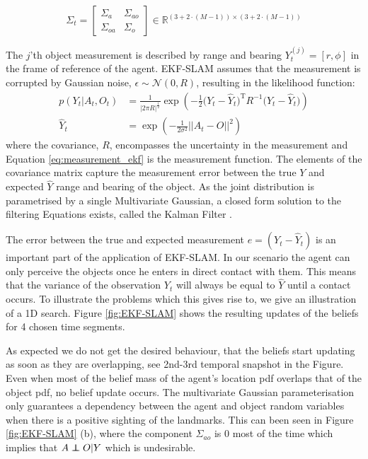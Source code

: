 \documentclass{frontiersSCNS} %
\newcommand\independent{\protect\mathpalette{\protect\independenT}{\perp}}\def\independenT#1#2{\mathrel{\rlap{$#1#2$}\mkern2mu{#1#2}}}
\begin{document}
\begin{equation}
\Sigma_t = \begin{bmatrix}
       \Sigma_a & \Sigma_{ao}  \\[0.3em]
       \Sigma_{oa} & \Sigma_o
     \end{bmatrix}
     \in \mathbb{R}^{(3 + 2\cdot (M-1)) \times (3 + 2\cdot (M-1))}
\end{equation}

The $j$'th object measurement is described by range and bearing  $Y^{(j)}_t = [r,\phi]$ in the frame of reference of the agent.
EKF-SLAM assumes that the measurement is corrupted by Gaussian noise, $\epsilon \sim \mathcal{N}(0,R)$,
resulting in the likelihood function:
\begin{align} 
   p(Y_t|A_t,O_t) &= \frac{1}{|2\pi R|^{\frac{1}{2}}} \exp \left( -\frac{1}{2} \big(Y_t - \hat{Y}_t\big)^{\mathrm{T}}R^{-1}\big(Y_t - \hat{Y}_t\big) \right)\label{eq:lik-measurement}\\
   \hat{Y}_t      &= \exp\left(-\frac{1}{2\sigma^2} ||A_t - O ||^2 \right)\label{eq:measurement_ekf}
\end{align}
where the covariance, $R$, encompasses the uncertainty in the measurement and Equation \ref{eq:measurement_ekf} is the measurement function. The elements of the covariance matrix capture 
the measurement error between the true $Y$ and expected $\hat{Y}$ range and bearing of the object. As the joint distribution 
is parametrised by a single Multivariate Gaussian, a closed form solution to the filtering Equations exists, called the Kalman 
Filter \cite{SLAM_part1}. 

The error between the true and expected measurement $e = (Y_t - \hat{Y}_t)$ is an important part of the application of EKF-SLAM.
In our scenario the agent can only perceive the objects once he enters in direct contact with them. 
This means that the variance of the observation $Y_t$ will always be equal to $\hat{Y}$ until a contact occurs. 
To illustrate the problems which this gives rise to, we give an illustration of a 1D search. Figure \ref{fig:EKF-SLAM} shows the 
resulting updates of the beliefs for 4 chosen time segments.

As expected we do not get the desired behaviour, that the beliefs start updating as soon as they are overlapping, 
see 2nd-3rd temporal snapshot in the Figure. 
Even when most of the belief mass of the agent's location pdf overlaps that of the object pdf, no belief update occurs. 
The multivariate Gaussian parameterisation only guarantees a dependency between the agent and object random variables 
when there is a positive sighting of the landmarks.  This can been seen in Figure \ref{fig:EKF-SLAM} (b),
where the component $\Sigma_{ao}$ is 0 most of the time which implies that $A \independent O | Y$ which is undesirable. 
\end{document}
